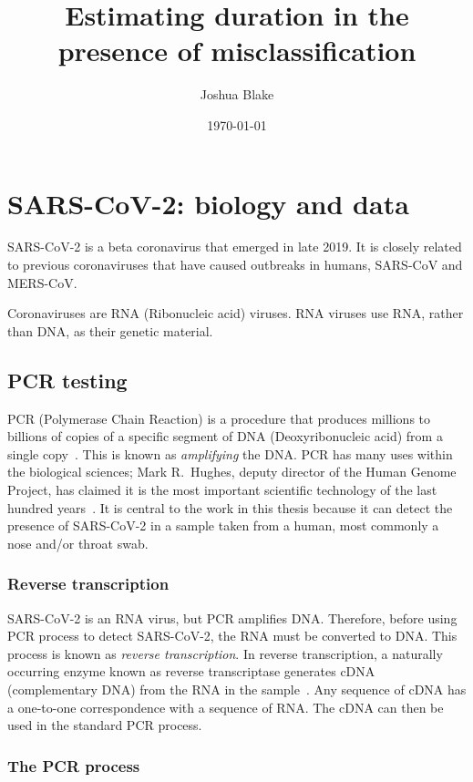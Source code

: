 \documentclass[thesis.tex]{subfiles}
\title{Estimating duration in the presence of misclassification}
\author{Joshua Blake}
\date{\today}
\begin{document}
\ifSubfilesClassLoaded{
  \setcounter{chapter}{1}
}

\chapter{SARS-CoV-2: biology and data} \label{biology-data}


SARS-CoV-2 is a beta coronavirus that emerged in late 2019.
It is closely related to previous coronaviruses that have caused outbreaks in humans, SARS-CoV and MERS-CoV.

Coronaviruses are RNA (Ribonucleic acid) viruses.
RNA viruses use RNA, rather than DNA, as their genetic material.


\section{PCR testing} \label{biology-data:sec:PCR}

PCR (Polymerase Chain Reaction) is a procedure that produces millions to billions of copies of a specific segment of DNA (Deoxyribonucleic acid) from a single copy~\autocite{smithPCR,garibyanPCR}.
This is known as \emph{amplifying} the DNA.
PCR has many uses within the biological sciences; Mark R.\ Hughes, deputy director of the Human Genome Project, has claimed it is the most important scientific technology of the last hundred years~\autocite{powledgePCR}.
It is central to the work in this thesis because it can detect the presence of SARS-CoV-2 in a sample taken from a human, most commonly a nose and/or throat swab.

\subsection{Reverse transcription}

SARS-CoV-2 is an RNA virus, but PCR amplifies DNA.
Therefore, before using PCR process to detect SARS-CoV-2, the RNA must be converted to DNA.
This process is known as \emph{reverse transcription}.
In reverse transcription, a naturally occurring enzyme known as reverse transcriptase generates cDNA (complementary DNA) from the RNA in the sample~\autocite{valasekPower}.
Any sequence of cDNA has a one-to-one correspondence with a sequence of RNA.
The cDNA can then be used in the standard PCR process.

\subsection{The PCR process} \label{biology-data:sec:PCR-process}
\end{document}
